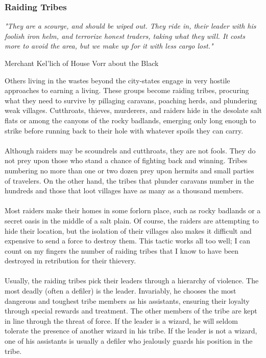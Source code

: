 \begin{multicols}{2}
\subsubsection{Raiding Tribes}
\epigraph{\textit{
"They are a scourge, and should be wiped out. They ride
in, their leader with his foolish iron helm, and terrorize
honest traders, taking what they will. It costs more to
avoid the area, but we make up for it with less cargo lost." }}
{ Merchant Kel'lich of House Vorr about the Black }

Others living in the wastes beyond the city‐states
engage in very hostile approaches to earning a living.
These groups become raiding tribes, procuring what they
need to survive by pillaging caravans, poaching herds,
and plundering weak villages. Cutthroats, thieves,
murderers, and raiders hide in the desolate salt flats or
among the canyons of the rocky badlands, emerging only
long enough to strike before running back to their hole
with whatever spoils they can carry.\\
\\
Although raiders may be scoundrels and cutthroats,
they are not fools. They do not prey upon those who
stand a chance of fighting back and winning. Tribes
numbering no more than one or two dozen prey upon
hermits and small parties of travelers. On the other hand,
the tribes that plunder caravans number in the hundreds
and those that loot villages have as many as a thousand
members.\\
\\
Most raiders make their homes in some forlorn place,
such as rocky badlands or a secret oasis in the middle of a
salt plain. Of course, the raiders are attempting to hide
their location, but the isolation of their villages also makes
it difficult and expensive to send a force to destroy them.
This tactic works all too well; I can count on my fingers
the number of raiding tribes that I know to have been
destroyed in retribution for their thievery.\\
\\
Usually, the raiding tribes pick their leaders through a
hierarchy of violence. The most deadly (often a defiler) is
the leader. Invariably, he chooses the most dangerous and
toughest tribe members as his assistants, ensuring their
loyalty through special rewards and treatment. The other
members of the tribe are kept in line through the threat of
force. If the leader is a wizard, he will seldom tolerate the
presence of another wizard in his tribe. If the leader is not
a wizard, one of his assistants is usually a defiler who
jealously guards his position in the tribe.

\end{multicols}
